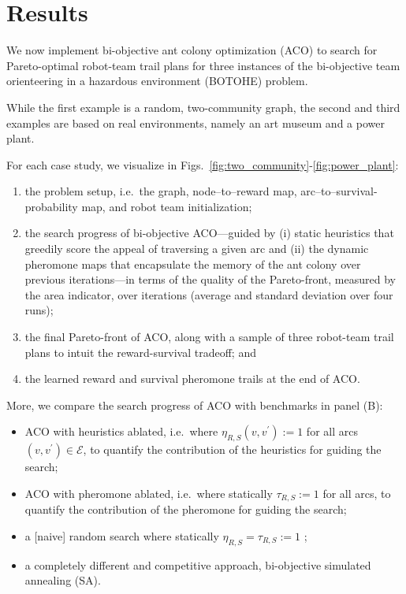 \documentclass[fleqn,10pt,lineno]{wlpeerj}
\begin{document}
\section{Results}
We now implement bi-objective ant colony optimization (ACO) to search for Pareto-optimal robot-team trail plans for three instances of the bi-objective team orienteering in a hazardous environment (BOTOHE) problem.

While the first example is a random, two-community graph, the second and third examples are based on real environments, namely an art museum and a power plant.

For each case study, we visualize in Figs.~\ref{fig:two_community}-\ref{fig:power_plant}:
\begin{enumerate}[noitemsep, label=(\Alph*)]
\item the problem setup, i.e.\ the graph, node--to--reward map, arc--to--survival-probability map, and robot team initialization;
\item the search progress of bi-objective ACO---guided by (i) static heuristics that greedily score the appeal of traversing a given arc and (ii) the dynamic pheromone maps that encapsulate the memory of the ant colony over previous iterations---in terms of the quality of the Pareto-front, measured by the area indicator, over iterations (average and standard deviation over four runs);
\item the final Pareto-front of ACO, along with a sample of three robot-team trail plans to intuit the reward-survival tradeoff; and
\item the learned reward and survival pheromone trails at the end of ACO.
\end{enumerate}
More, we compare the search progress of ACO with benchmarks in panel (B): 
\begin{itemize}[noitemsep]
\item ACO with heuristics ablated, i.e.\ where $\eta_{R, S}(v, v^\prime):=1$ for all arcs $(v, v^\prime)\in\mathcal{E}$, to quantify the contribution of the heuristics for guiding the search;
\item ACO with pheromone ablated, i.e.\ where statically $\tau_{R, S}:=1$ for all arcs, to quantify the contribution of the pheromone for guiding the search;
\item a [naive] random search where statically $\eta_{R, S}=\tau_{R,S}:=1$ ;
\item a completely different and competitive approach, bi-objective simulated annealing (SA).
\end{itemize}
\end{document}
